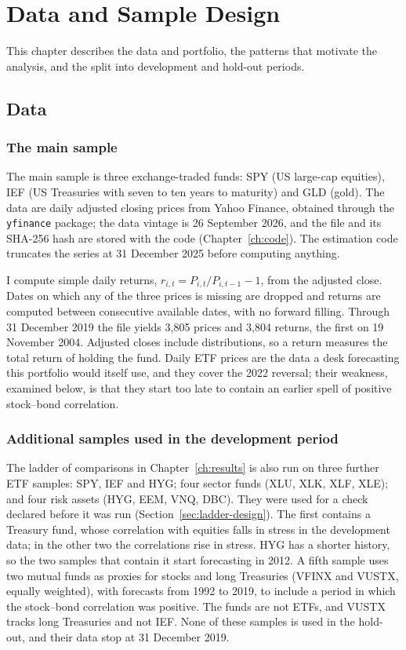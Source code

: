 \section{Data and Sample Design}\label{ch:data}

This chapter describes the data and portfolio, the patterns that motivate the analysis, and the split into development and hold-out periods.

\subsection{Data}

\subsubsection{The main sample}\label{sec:data}

The main sample is three exchange-traded funds: SPY (US large-cap equities), IEF (US Treasuries with seven to ten years to maturity) and GLD (gold). The data are daily adjusted closing prices from Yahoo Finance, obtained through the \texttt{yfinance} package; the data vintage is 26 September 2026, and the file and its SHA-256 hash are stored with the code (Chapter~\ref{ch:code}). The estimation code truncates the series at 31 December 2025 before computing anything.

I compute simple daily returns, $r_{i,t}=P_{i,t}/P_{i,t-1}-1$, from the adjusted close. Dates on which any of the three prices is missing are dropped and returns are computed between consecutive available dates, with no forward filling. Through 31 December 2019 the file yields 3,805 prices and 3,804 returns, the first on 19 November 2004. Adjusted closes include distributions, so a return measures the total return of holding the fund. Daily ETF prices are the data a desk forecasting this portfolio would itself use, and they cover the 2022 reversal; their weakness, examined below, is that they start too late to contain an earlier spell of positive stock--bond correlation.

\subsubsection{Additional samples used in the development period}\label{sec:samples}

The ladder of comparisons in Chapter~\ref{ch:results} is also run on three further ETF samples: SPY, IEF and HYG; four sector funds (XLU, XLK, XLF, XLE); and four risk assets (HYG, EEM, VNQ, DBC). They were used for a check declared before it was run (Section~\ref{sec:ladder-design}). The first contains a Treasury fund, whose correlation with equities falls in stress in the development data; in the other two the correlations rise in stress. HYG has a shorter history, so the two samples that contain it start forecasting in 2012. A fifth sample uses two mutual funds as proxies for stocks and long Treasuries (VFINX and VUSTX, equally weighted), with forecasts from 1992 to 2019, to include a period in which the stock--bond correlation was positive. The funds are not ETFs, and VUSTX tracks long Treasuries and not IEF. None of these samples is used in the hold-out, and their data stop at 31 December 2019.

